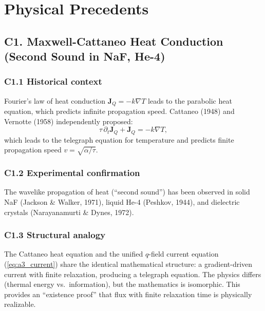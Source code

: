 \documentclass[reprint]{revtex4-2}
\begin{document}
\section{Physical Precedents}

\subsection{C1. Maxwell-Cattaneo Heat Conduction (Second Sound in NaF, He-4)}

\subsubsection{C1.1 Historical context}

Fourier's law of heat conduction $\mathbf{J}_Q = -k\nabla T$ leads to the parabolic heat equation, which predicts infinite propagation speed. Cattaneo (1948) and Vernotte (1958) independently proposed:
\begin{equation}
\tau\,\partial_t\mathbf{J}_Q + \mathbf{J}_Q = -k\nabla T,
\end{equation}
which leads to the telegraph equation for temperature and predicts finite propagation speed $v = \sqrt{\alpha/\tau}$.

\subsubsection{C1.2 Experimental confirmation}

The wavelike propagation of heat (``second sound'') has been observed in solid NaF (Jackson \& Walker, 1971), liquid He-4 (Peshkov, 1944), and dielectric crystals (Narayanamurti \& Dynes, 1972).

\subsubsection{C1.3 Structural analogy}

The Cattaneo heat equation and the unified $q$-field current equation (\ref{eq:a3_current}) share the identical mathematical structure: a gradient-driven current with finite relaxation, producing a telegraph equation. The physics differs (thermal energy vs.\ information), but the mathematics is isomorphic. This provides an ``existence proof'' that flux with finite relaxation time is physically realizable.
\end{document}
